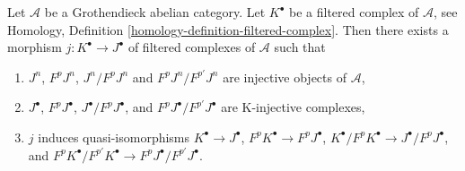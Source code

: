%
\begin{lemma}
\label{lemma-K-injective-embedding-filtration}
Let $\mathcal{A}$ be a Grothendieck abelian category.
Let $K^\bullet$ be a filtered complex of $\mathcal{A}$, see
Homology, Definition \ref{homology-definition-filtered-complex}.
Then there exists a morphism $j : K^\bullet \to J^\bullet$
of filtered complexes of $\mathcal{A}$ such that
\begin{enumerate}
\item $J^n$, $F^pJ^n$, $J^n/F^pJ^n$ and $F^pJ^n/F^{p'}J^n$ are injective
objects of $\mathcal{A}$,
\item $J^\bullet$, $F^pJ^\bullet$, $J^\bullet/F^pJ^\bullet$, and
$F^pJ^\bullet/F^{p'}J^\bullet$ are K-injective complexes,
\item $j$ induces quasi-isomorphisms
$K^\bullet \to J^\bullet$,
$F^pK^\bullet \to F^pJ^\bullet$,
$K^\bullet/F^pK^\bullet \to J^\bullet/F^pJ^\bullet$, and
$F^pK^\bullet/F^{p'}K^\bullet \to F^pJ^\bullet/F^{p'}J^\bullet$.
\end{enumerate}
\end{lemma}

